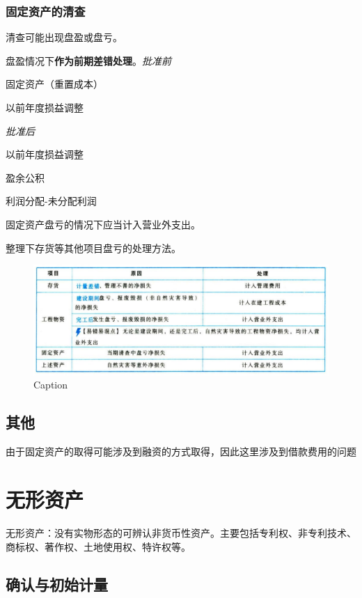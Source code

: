\documentclass[UTF8,12pt]{ctexart}
\newenvironment{Dr}{%
	\begin{list}{}%
		{
			\setlength{\leftmargin}{2em}
			\setlength{\labelwidth}{2em}
			\setlength{\labelsep}{0pt}
			\setlength{\itemindent}{0pt}
			\setlength{\listparindent}{0pt}
			\setlength{\parsep}{0pt}
			\setlength{\topsep}{0pt}
		}
		\item[\textbf{借：}]
	}{%
	\end{list}
}
\newenvironment{Cr}{%
	\begin{list}{}%
		{
			\setlength{\leftmargin}{2em}
			\setlength{\labelwidth}{2em}
			\setlength{\labelsep}{0pt}
			\setlength{\itemindent}{0pt}
			\setlength{\listparindent}{0pt}
			\setlength{\parsep}{0pt}
			\setlength{\topsep}{0pt}
		}
		\item[\textbf{贷：}]
	}{%
	\end{list}
}
\numberwithin{equation}{section} %
\numberwithin{figure}{section}
\numberwithin{table}{section}
\begin{document}
	\subsubsection{固定资产的清查}
	清查可能出现盘盈或盘亏。
	
	盘盈情况下\textbf{作为前期差错处理}。\textit{批准前}
	\begin{Dr}
		固定资产（重置成本）
	\end{Dr}
	\begin{Cr}
		以前年度损益调整
	\end{Cr}
	
	\textit{批准后}
	\begin{Dr}
		以前年度损益调整
	\end{Dr}
	\begin{Cr}
		盈余公积
		
		利润分配-未分配利润
	\end{Cr}
	
	固定资产盘亏的情况下应当计入营业外支出。
	
	整理下存货等其他项目盘亏的处理方法。
	\begin{figure}[htp]
		\centering
		\includegraphics[width=1\linewidth]{pic/3.4.png}
		\caption{Caption}
		\label{fig:enter-label}
	\end{figure}
	
	\subsection{其他}
	由于固定资产的取得可能涉及到融资的方式取得，因此这里涉及到借款费用的问题
	
	
	
	\newpage
	\section{无形资产}
	
	无形资产：没有实物形态的可辨认非货币性资产。主要包括专利权、非专利技术、商标权、著作权、土地使用权、特许权等。
	
	\subsection{确认与初始计量}
	
\end{document}
